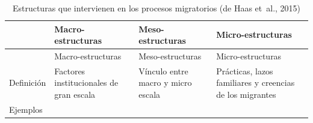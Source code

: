 \documentclass[12pt,spanish,]{article}
\begin{document}
\begin{longtable}[]{@{}llll@{}}
\caption{Estructuras que intervienen en los procesos migratorios (de
Haas et~al., 2015)}\tabularnewline
\toprule
\begin{minipage}[b]{0.07\columnwidth}\raggedright
\strut
\end{minipage} & \begin{minipage}[b]{0.26\columnwidth}\raggedright
Macro-estructuras\strut
\end{minipage} & \begin{minipage}[b]{0.21\columnwidth}\raggedright
Meso-estructuras\strut
\end{minipage} & \begin{minipage}[b]{0.34\columnwidth}\raggedright
Micro-estructuras\strut
\end{minipage}\tabularnewline
\midrule
\endfirsthead
\toprule
\begin{minipage}[b]{0.07\columnwidth}\raggedright
\strut
\end{minipage} & \begin{minipage}[b]{0.26\columnwidth}\raggedright
Macro-estructuras\strut
\end{minipage} & \begin{minipage}[b]{0.21\columnwidth}\raggedright
Meso-estructuras\strut
\end{minipage} & \begin{minipage}[b]{0.34\columnwidth}\raggedright
Micro-estructuras\strut
\end{minipage}\tabularnewline
\midrule
\endhead
\begin{minipage}[t]{0.07\columnwidth}\raggedright
Definición\strut
\end{minipage} & \begin{minipage}[t]{0.26\columnwidth}\raggedright
Factores institucionales de gran escala\strut
\end{minipage} & \begin{minipage}[t]{0.21\columnwidth}\raggedright
Vínculo entre macro y micro escala\strut
\end{minipage} & \begin{minipage}[t]{0.34\columnwidth}\raggedright
Prácticas, lazos familiares y creencias de los migrantes\strut
\end{minipage}\tabularnewline
\begin{minipage}[t]{0.07\columnwidth}\raggedright
Ejemplos\strut
\end{minipage} & \begin{minipage}[t]{0.26\columnwidth}\raggedright

\end{minipage}
\end{longtable}
\end{document}
